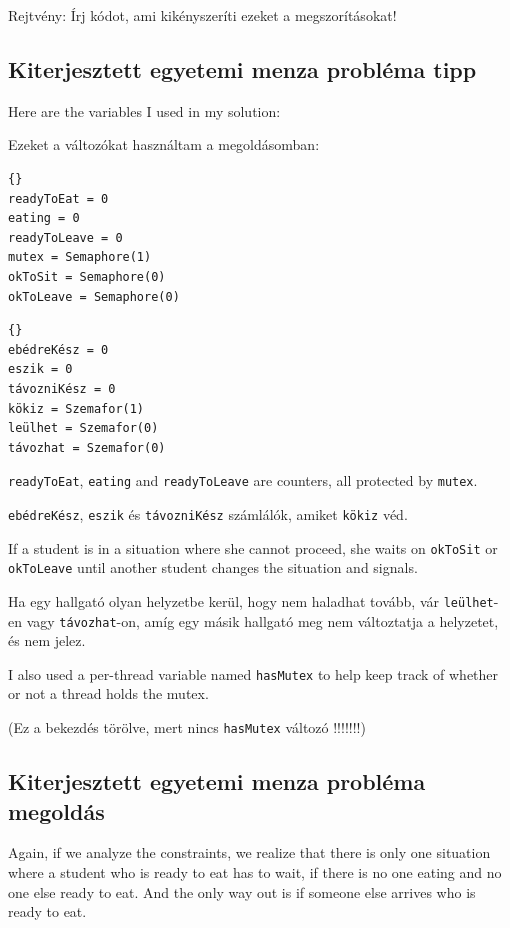 \documentclass{book}
\newcommand{\clearemptydoublepage}{\newpage\cleardoublepage}
\begin{document}
Rejtvény: Írj kódot, ami kikényszeríti ezeket a megszorításokat!


\clearemptydoublepage
\subsection{Kiterjesztett egyetemi menza probléma tipp}

Here are the variables I used in my solution:

Ezeket a változókat használtam a megoldásomban:

\begin{lstlisting}[title={Extended Dining Hall problem hint}]{}
readyToEat = 0
eating = 0
readyToLeave = 0
mutex = Semaphore(1)
okToSit = Semaphore(0)
okToLeave = Semaphore(0)
\end{lstlisting}

\begin{lstlisting}[title={Kiterjesztett egyetemi menza probléma tipp}]{}
ebédreKész = 0
eszik = 0
távozniKész = 0
kökiz = Szemafor(1)
leülhet = Szemafor(0)
távozhat = Szemafor(0)
\end{lstlisting}

{\tt readyToEat}, {\tt eating} and {\tt readyToLeave} are
counters, all protected by {\tt mutex}.

{\tt ebédreKész}, {\tt eszik} és {\tt távozniKész} számlálók,
amiket {\tt kökiz} véd.

If a student is in a situation where she cannot proceed, she
waits on
{\tt okToSit} or {\tt okToLeave} until another student changes
the situation and signals.

Ha egy hallgató olyan helyzetbe kerül, hogy nem haladhat tovább,
vár {\tt leülhet}-en vagy {\tt távozhat}-on, amíg egy másik
hallgató meg nem változtatja a helyzetet, és nem jelez.

I also used a per-thread variable named {\tt hasMutex} to help
keep track of whether or not a thread holds the mutex.

(Ez a bekezdés törölve, mert nincs {\tt hasMutex} változó !!!!!!!)

\clearemptydoublepage
\subsection{Kiterjesztett egyetemi menza probléma megoldás}

Again, if we analyze the constraints, we realize that there is
only one situation where a student who is ready to eat has
to wait, if there is no one eating and no one else ready to
eat.  And the only way out is if someone else arrives who
is ready to eat.
\end{document}
